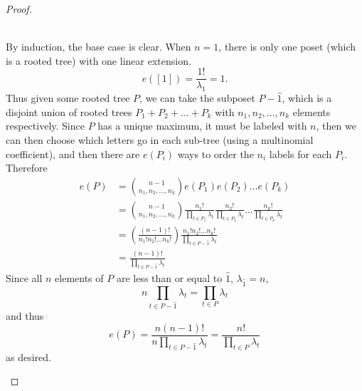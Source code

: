 \documentclass{article}
\begin{document}
\begin{proof}
\begin{enumerate}[a.]
    \\
    By induction, the base case is clear. When $n=1$, there is only
    one poset (which is a rooted tree) with one linear extension. \[
      e([1]) = \frac{1!}{\lambda_{1}} = 1.
    \]
    Thus given some rooted tree $P$, we can take the subposet $P - \hat 1$, which
    is a disjoint union of rooted trees
    $P_1 + P_2 + \hdots + P_k$ with $n_1, n_2, \hdots, n_k$ elements respectively.
    Since $P$ has a unique maximum, it must be labeled with $n$, then we can
    then choose which letters go in each sub-tree (using a multinomial
    coefficient), and then there are $e(P_i)$ ways to order the $n_i$ labels
    for each $P_i$. Therefore \begin{align*}
        e(P) &= \binom{n - 1}{n_1, n_2, \hdots, n_k}e(P_1)e(P_2)\hdots e(P_k)
        \\
        &= \binom{n - 1}{n_1, n_2, \hdots, n_k}
        \frac{n_1!}{\prod_{t \in P_1} \lambda_t}
        \frac{n_2!}{\prod_{t \in P_2} \lambda_t}
        \hdots
        \frac{n_k!}{\prod_{t \in P_k} \lambda_t}
        \\
        &= \left(\frac{(n - 1)!}{n_1! n_2! \hdots n_k!}\right)
        \frac{n_1!n_2!\hdots n_k!}{\prod_{t \in P - \hat 1} \lambda_t}
        \\
        &= \frac{(n-1)!}{\prod_{t \in P - \hat 1} \lambda_t}
    \end{align*}
    Since all $n$ elements of $P$ are less than or equal to $\hat 1$,
    $\lambda_{\hat 1} = n$, \[
      n\prod_{t \in P - \hat 1} \lambda_t = \prod_{t \in P} \lambda_t
    \] and thus \[
      e(P) = \frac{n(n-1)!}{n\prod_{t \in P - \hat 1} \lambda_t} = \frac{n!}{\prod_{t \in P} \lambda_t}
    \] as desired.
  \end{enumerate}
\end{proof}
\end{document}
